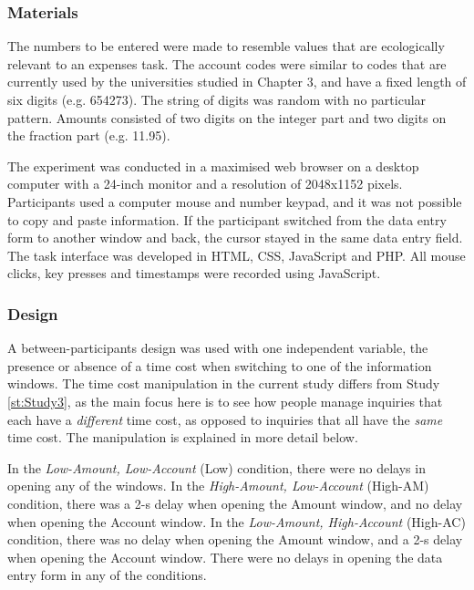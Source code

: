 \subsubsection{Materials}
The numbers to be entered were made to resemble values that are ecologically relevant to an expenses task. The account codes were similar to codes that are currently used by the universities studied in Chapter 3, and have a fixed length of six digits (e.g. 654273). The string of digits was random with no particular pattern. Amounts consisted of two digits on the integer part and two digits on the fraction part (e.g. 11.95). 

The experiment was conducted in a maximised web browser on a desktop computer with a 24-inch monitor and a resolution of 2048x1152 pixels. Participants used a computer mouse and number keypad, and it was not possible to copy and paste information. If the participant switched from the data entry form to another window and back, the cursor stayed in the same data entry field. The task interface was developed in HTML, CSS, JavaScript and PHP. All mouse clicks, key presses and timestamps were recorded using JavaScript.

\subsubsection{Design}
A between-participants design was used with one independent variable, the presence or absence of a time cost when switching to one of the information windows. The time cost manipulation in the current study differs from Study \ref{st:Study3}, as the main focus here is to see how people manage inquiries that each have a \textit{different} time cost, as opposed to inquiries that all have the \textit{same} time cost. The manipulation is explained in more detail below. 

In the \textit{Low-Amount, Low-Account} (Low) condition, there were no delays in opening any of the windows. In the \textit{High-Amount, Low-Account} (High-AM) condition, there was a 2-s delay when opening the Amount window, and no delay when opening the Account window. In the \textit{Low-Amount, High-Account} (High-AC) condition, there was no delay when opening the Amount window, and a 2-s delay when opening the Account window. There were no delays in opening the data entry form in any of the conditions.

